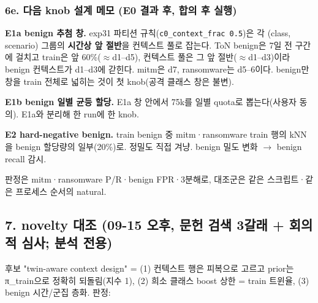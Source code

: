 \subsubsection{6e. 다음 knob 설계 메모 (E0 결과 후, 합의 후 실행)}
\par\noindent \textbullet\enspace \textbf{E1a benign 추첨 창.} exp31 파티션 규칙(\texttt{c0\_\allowbreak{}\allowbreak{}conte\allowbreak{}xt\_\allowbreak{}\allowbreak{}frac \allowbreak{}0.\allowbreak{}5})은 각 (class, scenario) 그룹의 \textbf{시간상 앞 절반}을 컨텍스트 풀로 잡는다. ToN benign은 7일 전 구간에 걸치고 train은 앞 60\%(\ensuremath{\approx}d1–d5), 컨텍스트 풀은 그 앞 절반(\ensuremath{\approx}d1–d3)이라 benign 컨텍스트가 d1–d3에 갇힌다. mitm은 d7, ransomware는 d5–6이다. benign만 창을 train 전체로 넓히는 것이 첫 knob(공격 클래스 창은 불변).


\par\noindent \textbullet\enspace \textbf{E1b benign 일별 균등 할당.} E1a 창 안에서 75k를 일별 quota로 뽑는다(사용자 동의). E1a와 분리해 한 run에 한 knob.


\par\noindent \textbullet\enspace \textbf{E2 hard-negative benign.} train benign 중 mitm·ransomware train 행의 kNN을 benign 할당량의 일부(20\%)로. 정밀도 직접 겨냥. benign 밀도 변화  \ensuremath{\rightarrow}  benign recall 감시.


\par\noindent \textbullet\enspace 판정은 mitm·ransomware P/\allowbreak{}R·benign FPR·3분해로, 대조군은 같은 스크립트·같은 프로세스 순서의 natural.


\subsection{7. novelty 대조 (09-15 오후, 문헌 검색 3갈래 +\allowbreak{} 회의적 심사; 분석 전용)}
후보 "twin-aware context design" =\allowbreak{} (1) 컨텍스트 행은 피복으로 고르고 prior는 π\_\allowbreak{}train으로 정확히 되돌림(지수 1), (2) 희소 클래스 boost 상한 =\allowbreak{} train 트윈율, (3) benign 시간/\allowbreak{}군집 층화. 판정:

